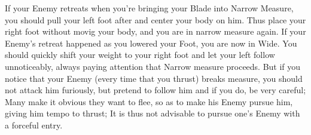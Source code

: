 If your Enemy retreats when you're bringing your Blade into Narrow
Measure, you should pull your left foot after and center your body on
him. Thus place your right foot without movig your body, and you are
in narrow measure again. If your Enemy's retreat happened as you
lowered your Foot, you are now in Wide. You should quickly shift your
weight to your right foot and let your left follow unnoticeably,
always paying attention that Narrow measure proceeds. But if you
notice that your Enemy (every time that you thrust) breaks measure,
you should not attack him furiously, but pretend to follow him and if
you do, be very careful; Many make it obvious they want to flee, so as
to make his Enemy pursue him, giving him tempo to thrust; It is thus
not advisable to pursue one's Enemy with a forceful entry.